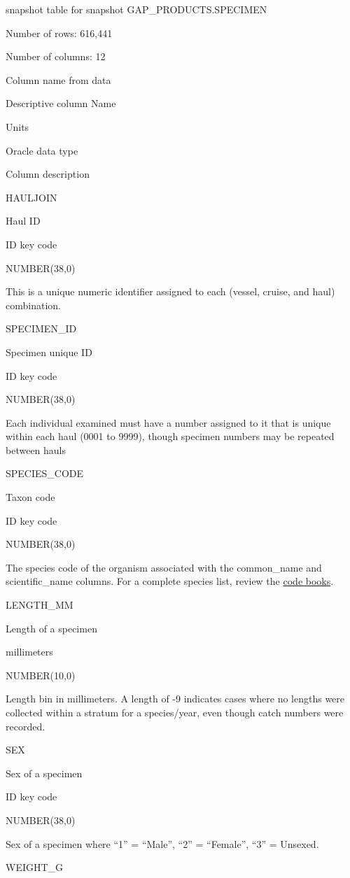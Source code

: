 \documentclass[
  letterpaper,
  oneside,
  open=any]{scrbook}
\begin{document}
snapshot table for snapshot GAP\_PRODUCTS.SPECIMEN

Number of rows: 616,441

Number of columns: 12

Column name from data

Descriptive column Name

Units

Oracle data type

Column description

HAULJOIN

Haul ID

ID key code

NUMBER(38,0)

This is a unique numeric identifier assigned to each (vessel, cruise,
and haul) combination.

SPECIMEN\_ID

Specimen unique ID

ID key code

NUMBER(38,0)

Each individual examined must have a number assigned to it that is
unique within each haul (0001 to 9999), though specimen numbers may be
repeated between hauls

SPECIES\_CODE

Taxon code

ID key code

NUMBER(38,0)

The species code of the organism associated with the common\_name and
scientific\_name columns. For a complete species list, review the
\href{https://www.fisheries.noaa.gov/resource/document/groundfish-survey-species-code-manual-and-data-codes-manual}{code
books}.

LENGTH\_MM

Length of a specimen

millimeters

NUMBER(10,0)

Length bin in millimeters. A length of -9 indicates cases where no
lengths were collected within a stratum for a species/year, even though
catch numbers were recorded.

SEX

Sex of a specimen

ID key code

NUMBER(38,0)

Sex of a specimen where ``1'' = ``Male'', ``2'' = ``Female'', ``3'' =
Unsexed.

WEIGHT\_G
\end{document}
